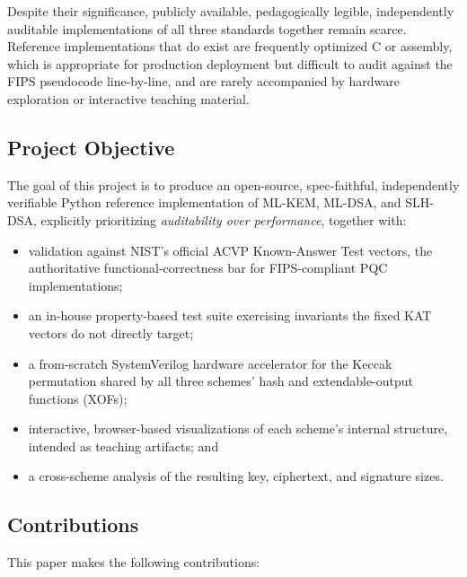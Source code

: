 \documentclass[10pt,conference]{IEEEtran}
\begin{document}
Despite their significance, publicly available, pedagogically legible,
independently auditable implementations of all three standards together
remain scarce. Reference implementations that do exist are frequently
optimized C or assembly, which is appropriate for production deployment
but difficult to audit against the FIPS pseudocode line-by-line, and are
rarely accompanied by hardware exploration or interactive teaching
material.

\subsection{Project Objective}

The goal of this project is to produce an open-source, spec-faithful,
independently verifiable Python reference implementation of ML-KEM,
ML-DSA, and SLH-DSA, explicitly prioritizing \emph{auditability over
performance}, together with:

\begin{itemize}
\item validation against NIST's official ACVP Known-Answer Test vectors,
  the authoritative functional-correctness bar for FIPS-compliant PQC
  implementations;
\item an in-house property-based test suite exercising invariants the
  fixed KAT vectors do not directly target;
\item a from-scratch SystemVerilog hardware accelerator for the Keccak
  permutation shared by all three schemes' hash and extendable-output
  functions (XOFs);
\item interactive, browser-based visualizations of each scheme's
  internal structure, intended as teaching artifacts; and
\item a cross-scheme analysis of the resulting key, ciphertext, and
  signature sizes.
\end{itemize}

\subsection{Contributions}

This paper makes the following contributions:
\end{document}
